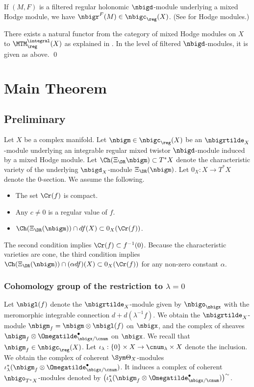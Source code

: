\documentclass[a4,10pt]{article}
\begin{document}
\begin{lem}
If $(M,F)$ is a filtered regular holonomic $\nbigd$-module
underlying a mixed Hodge module,
we have $\nbigr^F(M)\in \nbigc_{\reg}(X)$.
(See {\rm\cite{saito1,saito2}} for Hodge modules.)
\end{lem}
\pf
There exists a natural functor
from the category of mixed Hodge modules on $X$
to $\MTM^{\integral}_{\reg}(X)$
as explained in \cite[\S13.5]{Mochizuki-MTM}.
In the level of filtered $\nbigd$-modules,
it is given as above.
\hfill\qed

\section{Main Theorem}

\subsection{Preliminary}


Let $X$ be a complex manifold.
Let $\nbigm\in\nbigc_{\reg}(X)$ be an $\nbigrtilde_X$-module
underlying an integrable regular mixed twistor $\nbigd$-module
induced by a mixed Hodge module.
Let $\Ch(\Xi_{\DR}\nbigm)\subset T^{\ast}X$
denote the characteristic variety
of the underlying $\nbigd_X$-module $\Xi_{\DR}(\nbigm)$.
Let $0_X:X\to T^{\ast}X$ denote the $0$-section.
We assume the following.
\begin{itemize}
 \item The set $\Cr(f)$ is compact.
 \item Any $c\neq 0$ is a regular value of $f$.
 \item $\Ch(\Xi_{\DR}(\nbigm))\cap df(X)\subset 0_X(\Cr(f))$.
\end{itemize}
The second condition implies $\Cr(f)\subset f^{-1}(0)$.
Because the characteristic varieties are cone,
the third condition implies
$\Ch(\Xi_{\DR}(\nbigm))\cap (\alpha df)(X)\subset
0_X(\Cr(f))$
for any non-zero constant $\alpha$.

\subsubsection{Cohomology group of the restriction to $\lambda=0$}

Let $\nbigl(f)$ denote the $\nbigrtilde_X$-module
given by
$\nbigo_{\nbigx}$
with the meromorphic integrable connection
$d+d(\lambda^{-1}f)$.
We obtain the $\nbigrtilde_X$-module
$\nbigm_f=\nbigm\otimes\nbigl(f)$ on $\nbigx$,
and the complex of sheaves
$\nbigm_f\otimes\Omegatilde^{\bullet}_{\nbigx/\cnum}$
on $\nbigx$.
We recall that
$\nbigm_f\in\nbigc_{\reg}(X)$.
Let $\iota_{\lambda}:\{0\}\times X\to \cnum_{\lambda}\times X$
denote the inclusion.
We obtain the complex
of coherent $\Sym \Theta_X$-modules
$\iota_{\lambda}^{\ast}(\nbigm_f\otimes\Omegatilde^{\bullet}_{\nbigx/\cnum})$.
It induces a complex of
coherent $\nbigo_{T^{\ast}X}$-modules
denoted by
$\bigl(
\iota_{\lambda}^{\ast}(\nbigm_f\otimes\Omegatilde^{\bullet}_{\nbigx/\cnum})
\bigr)^{\sim}$.
\end{document}
